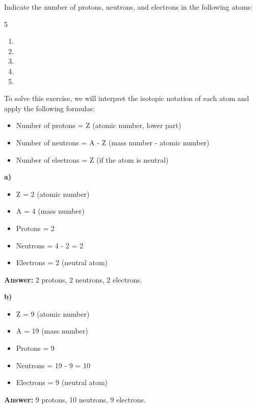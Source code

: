 \begin{exercise}
    Indicate the number of protons, neutrons, and electrons in the following atoms:
    \begin{multicols}{5}
        \begin{enumerate}[label=\letraminuscula]
        \item {}
        \item {}
        \item {}
        \item {}
        \item {}
        \end{enumerate}
    \end{multicols}
    \begin{solu}
        To solve this exercise, we will interpret the isotopic notation of each atom and apply the following formulas:
        \begin{itemize}
            \item Number of protons = Z (atomic number, lower part)
            \item Number of neutrons = A - Z (mass number - atomic number)
            \item Number of electrons = Z (if the atom is neutral)
        \end{itemize}

        \textbf{a) }
        \begin{itemize}
            \item Z = 2 (atomic number)
            \item A = 4 (mass number)
            \item Protons = 2
            \item Neutrons = 4 - 2 = 2
            \item Electrons = 2 (neutral atom)
        \end{itemize}
        \textbf{Answer:} 2 protons, 2 neutrons, 2 electrons.

        \textbf{b) }
        \begin{itemize}
            \item Z = 9 (atomic number)
            \item A = 19 (mass number)
            \item Protons = 9
            \item Neutrons = 19 - 9 = 10
            \item Electrons = 9 (neutral atom)
        \end{itemize}
        \textbf{Answer:} 9 protons, 10 neutrons, 9 electrons.


\end{solu}
\end{exercise}
